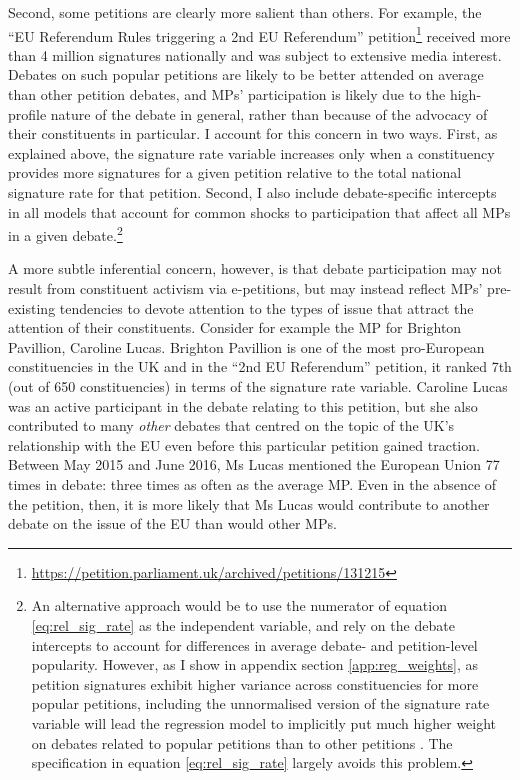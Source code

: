 \documentclass[12pt]{article}
\begin{document}
Second, some petitions are clearly more salient than others. For example, the ``EU Referendum Rules triggering a 2nd EU Referendum'' petition\footnote{\url{https://petition.parliament.uk/archived/petitions/131215}} received more than 4 million signatures nationally and was subject to extensive media interest. Debates on such popular petitions are likely to be better attended on average than other petition debates, and MPs' participation is likely due to the high-profile nature of the debate in general, rather than because of the advocacy of their constituents in particular. I account for this concern in two ways. First, as explained above, the signature rate variable increases only when a constituency provides more signatures for a given petition relative to the total national signature rate for that petition. Second, I also include debate-specific intercepts in all models that account for common shocks to participation that affect all MPs in a given debate.\footnote{An alternative approach would be to use the numerator of equation \ref{eq:rel_sig_rate} as the independent variable, and rely on the debate intercepts to account for differences in average debate- and petition-level popularity. However, as I show in appendix section \ref{app:reg_weights}, as petition signatures exhibit higher variance across constituencies for more popular petitions, including the unnormalised version of the signature rate variable will lead the regression model to implicitly put much higher weight on debates related to popular petitions than to other petitions \citep{aronow2016does}. The specification in equation \ref{eq:rel_sig_rate} largely avoids this problem.}

A more subtle inferential concern, however, is that debate participation may not result from constituent activism via e-petitions, but may instead reflect MPs' pre-existing tendencies to devote attention to the types of issue that attract the attention of their constituents. Consider for example the MP for Brighton Pavillion, Caroline Lucas. Brighton Pavillion is one of the most pro-European constituencies in the UK \citep{hanretty2015estimating} and in the ``2nd EU Referendum'' petition, it ranked 7th (out of 650 constituencies) in terms of the signature rate variable. Caroline Lucas was an active participant in the debate relating to this petition, but she also contributed to many \emph{other} debates that centred on the topic of the UK's relationship with the EU even before this particular petition gained traction. Between May 2015 and June 2016, Ms Lucas mentioned the European Union 77 times in debate: three times as often as the average MP. Even in the absence of the petition, then, it is more likely that Ms Lucas would contribute to another debate on the issue of the EU than would other MPs.
\end{document}
